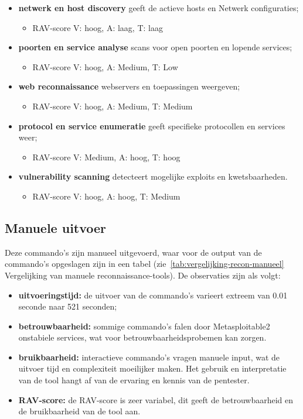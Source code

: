 \begin{itemize}
  \item \textbf{netwerk en host discovery} geeft de actieve hosts en Netwerk configuraties;
    {\scriptsize \begin{itemize}
      \item \textmd{RAV-score} V: hoog, A: laag, T: laag
    \end{itemize} }
  \item \textbf{poorten en service analyse} scans voor open poorten en lopende services;
    {\scriptsize \begin{itemize}
      \item \textmd{RAV-score} V: hoog, A: Medium, T: Low
    \end{itemize} }
  \item \textbf{web reconnaissance} webservers en toepassingen weergeven;
    {\scriptsize \begin{itemize}
      \item \textmd{RAV-score} V: hoog, A: Medium, T: Medium
    \end{itemize} }
  \item \textbf{protocol en service enumeratie } geeft specifieke protocollen en services weer;
  {\scriptsize \begin{itemize}
    \item \textmd{RAV-score} V: Medium, A: hoog, T: hoog
  \end{itemize} }
  \item \textbf{vulnerability scanning} detecteert mogelijke exploits en kwetsbaarheden.
  {\scriptsize \begin{itemize}
    \item \textmd{RAV-score} V: hoog, A: hoog, T: Medium
  \end{itemize} }
\end{itemize}
  
\subsection{Manuele uitvoer}
Deze commando's zijn manueel uitgevoerd, waar voor de output van de commando's opgeslagen zijn in een tabel (zie~\ref{tab:vergelijking-recon-manueel} Vergelijking van manuele reconnaissance-tools).
De observaties zijn als volgt:

\begin{itemize}
  \item \textbf{uitvoeringstijd:} de uitvoer van de commando's varieert extreem van 0.01 seconde naar 521 seconden;
  \item \textbf{betrouwbaarheid:} sommige commando's falen door Metasploitable2 onstabiele services, wat voor betrouwbaarheidsprobemen kan zorgen.
  \item \textbf{bruikbaarheid:} interactieve commando's vragen manuele input, wat de uitvoer tijd en complexiteit moeilijker maken. Het gebruik en interpretatie van de tool hangt af van de ervaring en kennis van de pentester.
  \item \textbf{RAV-score:} de RAV-score is zeer variabel, dit geeft de betrouwbaarheid en de bruikbaarheid van de tool aan.

\end{itemize}

